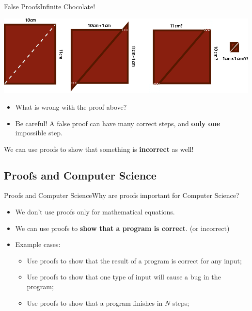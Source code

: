 \begin{frame}{False Proofs}{Infinite Chocolate!}
  \begin{center}
    \includegraphics[width=.9\textwidth]{../img/false_proof}
  \end{center}
  \begin{itemize}
    \item What is wrong with the proof above?
    \item \alert{Be careful!} A false proof can have many correct steps, and {\bf only one} impossible step.
  \end{itemize}

  \begin{block}{}
    We can use proofs to show that something is {\bf incorrect} as well!
  \end{block}
\end{frame}

\subsection{Proofs and Computer Science}

\begin{frame}{Proofs and Computer Science}{Why are proofs important for Computer Science?}

  \begin{itemize}
    \item We don't use proofs only for mathematical equations.
    \item We can use proofs to {\bf show that a program is correct}. (or incorrect)
    \vfill

    \item Example cases:
    \begin{itemize}
    \item Use proofs to show that the result of a program is correct for any input;
    \item Use proofs to show that one type of input will cause a bug in the program;
    \item Use proofs to show that a program finishes in $N$ steps;
    \end{itemize}
  \end{itemize}
\end{frame}


